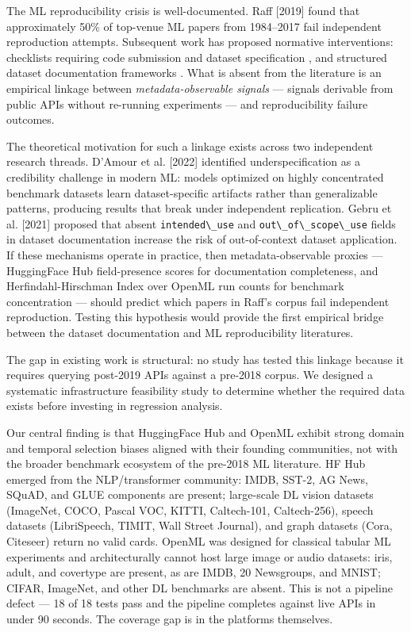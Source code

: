 
The ML reproducibility crisis is well-documented. Raff [2019] found that approximately 50\% of top-venue ML papers from 1984--2017 fail independent reproduction attempts. Subsequent work has proposed normative interventions: checklists requiring code submission and dataset specification \citep{Pineau2021Improving}, and structured dataset documentation frameworks \citep{Gebru2021Datasheets}. What is absent from the literature is an empirical linkage between \textit{metadata-observable signals} --- signals derivable from public APIs without re-running experiments --- and reproducibility failure outcomes.

The theoretical motivation for such a linkage exists across two independent research threads. D'Amour et al. [2022] identified underspecification as a credibility challenge in modern ML: models optimized on highly concentrated benchmark datasets learn dataset-specific artifacts rather than generalizable patterns, producing results that break under independent replication. Gebru et al. [2021] proposed that absent \texttt{intended\textbackslash \_use} and \texttt{out\textbackslash \_of\textbackslash \_scope\textbackslash \_use} fields in dataset documentation increase the risk of out-of-context dataset application. If these mechanisms operate in practice, then metadata-observable proxies --- HuggingFace Hub field-presence scores for documentation completeness, and Herfindahl-Hirschman Index over OpenML run counts for benchmark concentration --- should predict which papers in Raff's corpus fail independent reproduction. Testing this hypothesis would provide the first empirical bridge between the dataset documentation and ML reproducibility literatures.

The gap in existing work is structural: no study has tested this linkage because it requires querying post-2019 APIs against a pre-2018 corpus. We designed a systematic infrastructure feasibility study to determine whether the required data exists before investing in regression analysis.

Our central finding is that HuggingFace Hub and OpenML exhibit strong domain and temporal selection biases aligned with their founding communities, not with the broader benchmark ecosystem of the pre-2018 ML literature. HF Hub emerged from the NLP/transformer community: IMDB, SST-2, AG News, SQuAD, and GLUE components are present; large-scale DL vision datasets (ImageNet, COCO, Pascal VOC, KITTI, Caltech-101, Caltech-256), speech datasets (LibriSpeech, TIMIT, Wall Street Journal), and graph datasets (Cora, Citeseer) return no valid cards. OpenML was designed for classical tabular ML experiments and architecturally cannot host large image or audio datasets: iris, adult, and covertype are present, as are IMDB, 20 Newsgroups, and MNIST; CIFAR, ImageNet, and other DL benchmarks are absent. This is not a pipeline defect --- 18 of 18 tests pass and the pipeline completes against live APIs in under 90 seconds. The coverage gap is in the platforms themselves.

